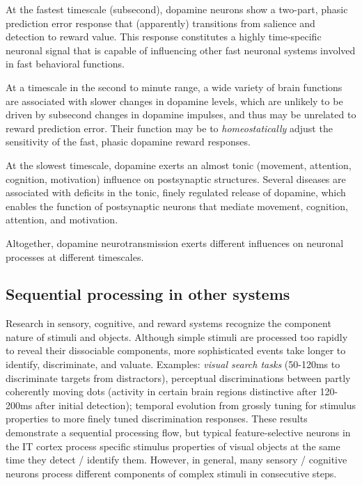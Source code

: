 \documentclass{article}
\numberwithin{equation}{section}
\begin{document}
At the fastest timescale (subsecond), dopamine neurons show a two-part, phasic prediction error response that (apparently) transitions from salience and detection to reward value. This response constitutes a highly time-specific neuronal signal that is capable of influencing other fast neuronal systems involved in fast behavioral functions.

At a timescale in the second to minute range, a wide variety of brain functions are associated with slower changes in dopamine levels, which are unlikely to be driven by subsecond changes in dopamine impulses, and thus may be unrelated to reward prediction error. Their function may be to \textit{homeostatically} adjust the sensitivity of the fast, phasic dopamine reward responses.

At the slowest timescale, dopamine exerts an almost tonic (movement, attention, cognition, motivation) influence on postsynaptic structures. Several diseases are associated with deficits in the tonic, finely regulated release of dopamine, which enables the function of postsynaptic neurons that mediate movement, cognition, attention, and motivation.

Altogether, dopamine neurotransmission exerts different influences on neuronal processes at different timescales.

\subsection{Sequential processing in other systems}

Research in sensory, cognitive, and reward systems recognize the component nature of stimuli and objects. Although simple stimuli are processed too rapidly to reveal their dissociable components, more sophisticated events take longer to identify, discriminate, and valuate. Examples: \textit{visual search tasks} (50-120ms to discriminate targets from distractors), perceptual discriminations between partly coherently moving dots (activity in certain brain regions distinctive after 120-200ms after initial detection); temporal evolution from grossly tuning for stimulus properties to more finely tuned discrimination responses. These results demonstrate a sequential processing flow, but typical feature-selective neurons in the IT cortex process specific stimulus properties of visual objects at the same time they detect / identify them. However, in general, many sensory / cognitive neurons process different components of complex stimuli in consecutive steps.
\end{document}
